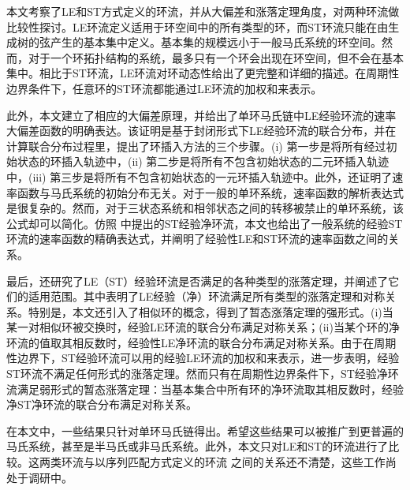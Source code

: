 本文考察了LE和ST方式定义的环流，并从大偏差和涨落定理角度，对两种环流做比较性探讨。LE环流定义适用于环空间中的所有类型的环，而ST环流只能在由生成树的弦产生的基本集中定义。基本集的规模远小于一般马氏系统的环空间。然而，对于一个环拓扑结构的系统，最多只有一个环会出现在环空间，但不会在基本集中。相比于ST环流，LE环流对环动态性给出了更完整和详细的描述。在周期性边界条件下，任意环的ST环流都能通过LE环流的加权和来表示。

此外，本文建立了相应的大偏差原理，并给出了单环马氏链中LE经验环流的速率大偏差函数的明确表达。该证明是基于封闭形式下LE经验环流的联合分布，并在计算联合分布过程里，提出了环插入方法的三个步骤。(i) 第一步是将所有经过初始状态的环插入轨迹中，(ii) 第二步是将所有不包含初始状态的二元环插入轨迹中，(iii) 第三步是将所有不包含初始状态的一元环插入轨迹中。此外，还证明了速率函数与马氏系统的初始分布无关。对于一般的单环系统，速率函数的解析表达式是很复杂的。然而，对于三状态系统和相邻状态之间的转移被禁止的单环系统，该公式却可以简化。仿照 \cite{bertini2015flows} 中提出的ST经验净环流，本文也给出了一般系统的经验ST环流的速率函数的精确表达式，并阐明了经验性LE和ST环流的速率函数之间的关系。

最后，还研究了LE（ST）经验环流是否满足的各种类型的涨落定理，并阐述了它们的适用范围。其中表明了LE经验（净）环流满足所有类型的涨落定理和对称关系。特别是，本文还引入了相似环的概念，得到了暂态涨落定理的强形式。(i)当某一对相似环被交换时，经验LE环流的联合分布满足对称关系；(ii)当某个环的净环流的值取其相反数时，经验性LE净环流的联合分布满足对称关系。由于在周期性边界下，ST经验环流可以用的经验LE环流的加权和来表示，进一步表明，经验ST环流不满足任何形式的涨落定理。然而只有在周期性边界条件下，ST经验净环流满足弱形式的暂态涨落定理：当基本集合中所有环的净环流取其相反数时，经验净ST净环流的联合分布满足对称关系。

在本文中，一些结果只针对单环马氏链得出。希望这些结果可以被推广到更普遍的马氏系统，甚至是半马氏或非马氏系统。此外，本文只对LE和ST的环流进行了比较。这两类环流与以序列匹配方式定义的环流 \cite{roldan2019exact,biddle2020reversal,pietzonka2021cycle} 之间的关系还不清楚，这些工作尚处于调研中。